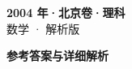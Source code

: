 \documentclass[zihao=-4, a4paper]{ctexart}
\begin{document}
\begin{center}
  {\Large\bfseries 2004 年·北京卷·理科}\\[4pt]
  {\large 数学 · 解析版}
\end{center}
\medskip
{}

\clearpage
{}
\begin{center}{\Large\bfseries 参考答案与详细解析}\end{center}
\medskip

\end{document}
